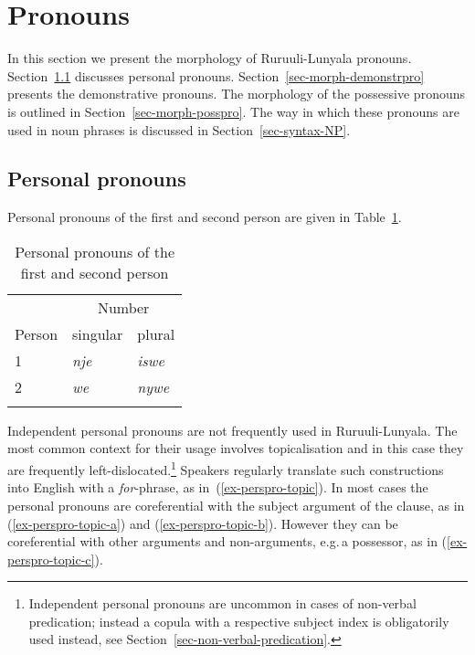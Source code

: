 \section{Pronouns}\label{sec-pronouns}

In this section we present the morphology of Ru\-ruu\-li\hyp{}Lu\-nya\-la pronouns.
Section~\ref{sec-pronouns-perspro} discusses personal pronouns. 
Section~\ref{sec-morph-demonstrpro} presents the demonstrative pronouns. 
The morphology of the possessive pronouns is outlined in Section~\ref{sec-morph-posspro}. 
The way in which these pronouns are used in noun phrases is discussed in Section~\ref{sec-syntax-NP}.


\subsection{Personal pronouns}\label{sec-pronouns-perspro}

Personal pronouns of the first and second person are given in Table~\ref{tab-personal-pronouns}.

\begin{table}
\caption{Personal pronouns of the first and second person}
\begin{tabular}{l l l }
\lsptoprule
& \multicolumn{2}{c}{Number}\\
Person & singular & plural\\
\midrule

1 & \textit{nje} & \textit{iswe}\\
2 & \textit{we} & \textit{nywe}\\

\lspbottomrule
\end{tabular}
\label{tab-personal-pronouns}
\end{table}

Independent personal pronouns are not frequently used in Ru\-ruu\-li\hyp{}Lu\-nya\-la. 
The most common context for their usage involves topicalisation and in this case they are frequently left-dislocated.\footnote{Independent personal pronouns are uncommon in cases of non-verbal predication; instead a copula with a respective subject index is obligatorily used instead, see Section~\ref{sec-non-verbal-predication}.} 
Speakers regularly translate such constructions into English with a \textit{for}-phrase, as in~(\ref{ex-perspro-topic}). 
In most cases the personal pronouns are coreferential with the subject argument of the clause, as in (\ref{ex-perspro-topic-a}) and (\ref{ex-perspro-topic-b}). 
However they can be coreferential with other arguments and non-arguments, e.g.\,a possessor, as in (\ref{ex-perspro-topic-c}). 

